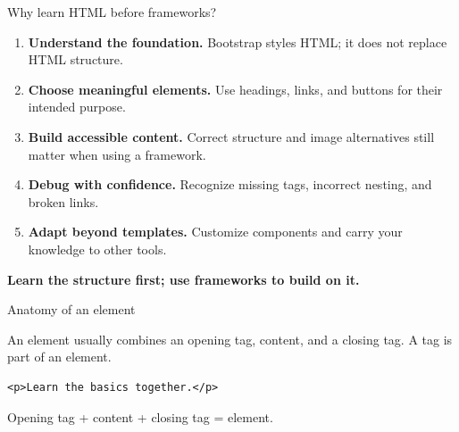 \documentclass[aspectratio=169,12pt]{beamer}
\begin{document}
\begin{frame}{Why learn HTML before frameworks?}
\begin{enumerate}
\item \textbf{Understand the foundation.} Bootstrap styles HTML; it does not replace HTML structure.
\item \textbf{Choose meaningful elements.} Use headings, links, and buttons for their intended purpose.
\item \textbf{Build accessible content.} Correct structure and image alternatives still matter when using a framework.
\item \textbf{Debug with confidence.} Recognize missing tags, incorrect nesting, and broken links.
\item \textbf{Adapt beyond templates.} Customize components and carry your knowledge to other tools.
\end{enumerate}
\medskip
\textbf{Learn the structure first; use frameworks to build on it.}
\end{frame}

\begin{frame}[fragile]{Anatomy of an element}
\begin{conceptblock}
An element usually combines an opening tag, content, and a closing tag. A tag is part of an element.
\end{conceptblock}
\begin{lstlisting}
<p>Learn the basics together.</p>
\end{lstlisting}

\small Opening tag + content + closing tag = element.
\end{frame}
\end{document}
